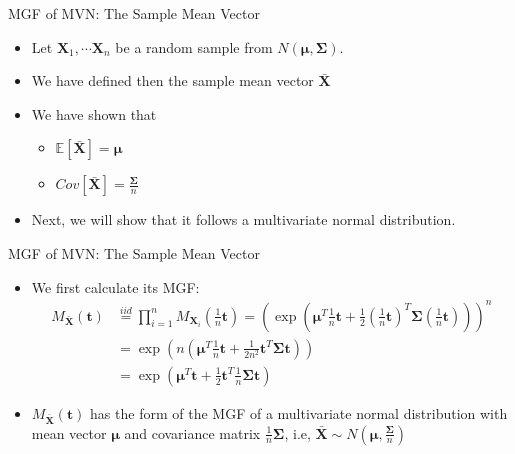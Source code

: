 \documentclass[
  ignorenonframetext,
]{beamer}
\providecommand{\tightlist}{%
  \setlength{\itemsep}{0pt}\setlength{\parskip}{0pt}}
\begin{document}
\begin{frame}{MGF of MVN: The Sample Mean Vector}
\protect\hypertarget{mgf-of-mvn-the-sample-mean-vector}{}
\begin{itemize}
\tightlist
\item
  Let \(\mathbf X_1, \cdots \mathbf X_n\) be a random sample from
  \(N(\boldsymbol \mu, \boldsymbol \Sigma)\).
\item
  We have defined then the sample mean vector \(\bar{\mathbf{X}}\)
\item
  We have shown that

  \begin{itemize}
  \tightlist
  \item
    \(\mathbb E[\bar{\mathbf{X}}]=\boldsymbol \mu\)
  \item
    \(Cov[\bar{\mathbf{X}}]=\frac{\boldsymbol \Sigma}{n}\)
  \end{itemize}
\item
  Next, we will show that it follows a multivariate normal distribution.
\end{itemize}
\end{frame}

\begin{frame}{MGF of MVN: The Sample Mean Vector}
\protect\hypertarget{mgf-of-mvn-the-sample-mean-vector-1}{}
\begin{itemize}
\tightlist
\item
  We first calculate its MGF: \[
  \begin{aligned}
  M_{\bar{\mathbf{X}}}(\mathbf{t}) &\overset{iid}= \prod_{i=1}^n M_{\mathbf{X}_i}(\frac{1}{n}\mathbf{t}) = \left(\exp\left(\boldsymbol{\mu}^T \frac{1}{n}\mathbf{t} + \frac{1}{2} \left(\frac{1}{n}\mathbf{t}\right)^T \boldsymbol{\Sigma} \left(\frac{1}{n}\mathbf{t}\right)\right)\right)^n\\
  &= \exp\left(n\left(\boldsymbol{\mu}^T \frac{1}{n}\mathbf{t} + \frac{1}{2n^2} \mathbf{t}^T \boldsymbol{\Sigma} \mathbf{t}\right)\right) \\
  &= \exp\left(\boldsymbol{\mu}^T \mathbf{t} + \frac{1}{2} \mathbf{t}^T \frac{1}{n}\boldsymbol{\Sigma} \mathbf{t}\right)
  \end{aligned}
  \]
\item
  \(M_{\bar{\mathbf{X}}}(\mathbf{t})\) has the form of the MGF of a
  multivariate normal distribution with mean vector \(\boldsymbol{\mu}\)
  and covariance matrix \(\frac{1}{n}\boldsymbol{\Sigma}\), i.e,
  \(\bar{\mathbf{X}}\sim N(\boldsymbol \mu , \frac{\boldsymbol \Sigma}{n})\)
\end{itemize}
\end{frame}
\end{document}
